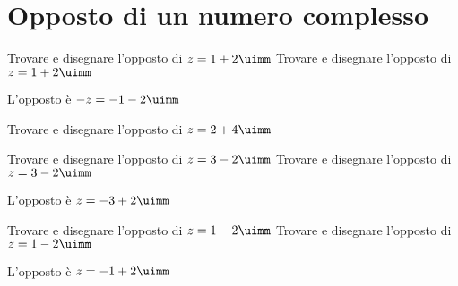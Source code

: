  \section{Opposto di un numero complesso}
\begin{exercise}
	Trovare e disegnare l'opposto di $z=1+2\uimm$
	\tcblower
	Trovare e disegnare l'opposto di $z=1+2\uimm$
	
	L'opposto è $-z=-1-2\uimm$
	\begin{center}
		
		\label{fig:disegnopianocomplesso03}
	\end{center}
\end{exercise}
\begin{exercise}[no solution]
	Trovare e disegnare l'opposto di $z=2+4\uimm$
\end{exercise}
\begin{exercise}
	Trovare e disegnare l'opposto di $z=3-2\uimm$
	\tcblower
	Trovare e disegnare l'opposto di $z=3-2\uimm$
	
	L'opposto è $z=-3+2\uimm$
	\begin{center}
		
		\label{fig:disegnopianocomplesso04}
	\end{center}
\end{exercise}
\begin{exercise}
	Trovare e disegnare l'opposto di $z=1-2\uimm$
	\tcblower
	Trovare e disegnare l'opposto di $z=1-2\uimm$
	
	L'opposto è $z=-1+2\uimm$
	\begin{center}
		
		\label{fig:disegnopianocomplesso13}
	\end{center}
\end{exercise}


